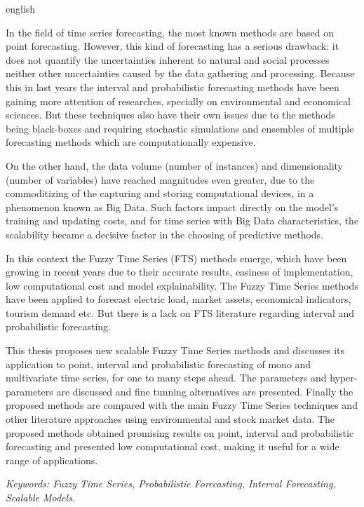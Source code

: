 \begin{resumo}[Abstract]
    \begin{otherlanguage*}{english}

In the field of time series forecasting, the most known methods are based on point forecasting. However, this kind of forecasting has a serious drawback: it does not quantify the uncertainties inherent to natural and social processes neither other uncertainties caused by the data gathering and processing. Because this in last years the interval and probabilistic forecasting methods have been gaining more attention of researches, specially on environmental and economical sciences. But these techniques also have their own issues due to the methods being black-boxes and requiring stochastic simulations and ensembles of multiple forecasting methods which are computationally expensive.

On the other hand, the data volume (number of instances) and dimensionality (number of variables) have reached magnitudes even greater, due to the commoditizing of the capturing and storing computational devices, in a phenomenon known as Big Data. Such factors impact directly on the model's training and updating costs, and for time series with Big Data characteristics, the scalability became a decisive factor in the choosing of predictive methods.

In this context the Fuzzy Time Series (FTS) methods emerge, which have been growing in recent years due to their accurate results, easiness of implementation, low computational cost and model explainability. The Fuzzy Time Series methods have been applied to forecast electric load, market assets, economical indicators, tourism demand etc. But there is a lack on FTS literature regarding interval and probabilistic forecasting.

This thesis proposes new scalable Fuzzy Time Series methods and discusses its application to  point, interval and probabilistic forecasting of mono and multivariate time series, for one to many steps ahead. The parameters and hyper-parameters are discussed and fine tunning alternatives are presented. Finally the proposed methods are compared with the main Fuzzy Time Series techniques and other literature approaches using environmental and stock market data. The proposed methods obtained promising results on point, interval and probabilistic forecasting and presented low computational cost, making it useful for a wide range of applications.

\textit{Keywords: Fuzzy Time Series, Probabilistic Forecasting, Interval Forecasting, Scalable Models.}
    \end{otherlanguage*}
\end{resumo}